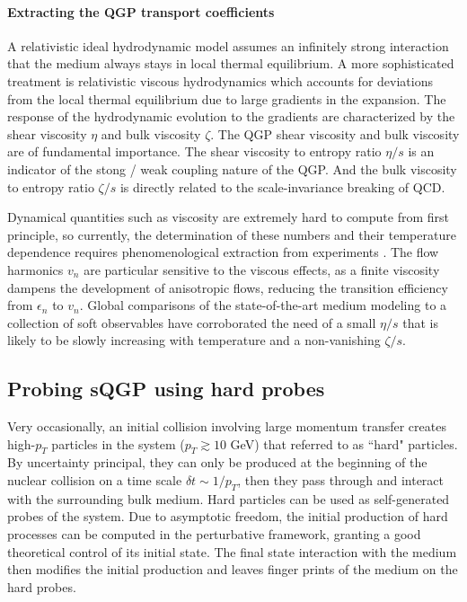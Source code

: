 \paragraph{Extracting the QGP transport coefficients}
A relativistic ideal hydrodynamic model assumes an infinitely strong interaction that the medium always stays in local thermal equilibrium.
A more sophisticated treatment is relativistic viscous hydrodynamics which accounts for deviations from the local thermal equilibrium due to large gradients in the expansion.
The response of the hydrodynamic evolution to the gradients are characterized by the shear viscosity $\eta$ and bulk viscosity $\zeta$.
The QGP shear viscosity and bulk viscosity are of fundamental importance. 
The shear viscosity to entropy ratio $\eta/s$ is an indicator of the stong / weak coupling nature of the QGP. 
And the bulk viscosity to entropy ratio $\zeta/s$ is directly related to  the scale-invariance breaking of QCD.

Dynamical quantities such as viscosity are extremely hard to compute from first principle, so currently, the determination of these numbers and their temperature dependence requires phenomenological extraction from experiments \cite{Muronga:2004sf, Chaudhuri:2006jd, Romatschke:2007mq, Dusling:2007gi, Song:2007ux, Luzum:2008cw}.
The flow harmonics $v_n$ are particular sensitive to the viscous effects, as a finite viscosity dampens the development of anisotropic flows, reducing the transition efficiency from $\epsilon_n$ to $v_n$.
Global comparisons of the state-of-the-art medium modeling to a collection of soft observables have corroborated the need of a small $\eta/s$ that is likely to be slowly increasing with temperature and a non-vanishing $\zeta/s$.

\subsection{Probing sQGP using hard probes}
Very occasionally, an initial collision involving large momentum transfer creates high-$p_T$ particles in the system ($p_T\gtrsim 10$ GeV) that referred to as ``hard" particles.
By uncertainty principal, they can only be produced at the beginning of the nuclear collision on a time scale $\delta t \sim 1/p_T$, then they pass through and interact with the surrounding bulk medium.
Hard particles can be used as self-generated probes of the system.
Due to asymptotic freedom, the initial production of hard processes can be computed in the perturbative framework, granting a good theoretical control of its initial state.
The final state interaction with the medium then modifies the initial production and leaves finger prints of the medium on the hard probes.

